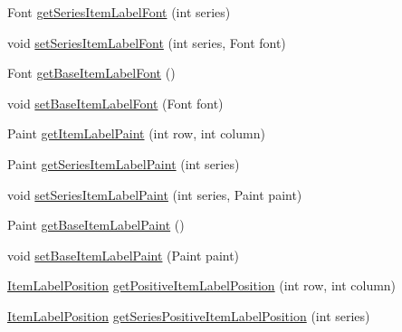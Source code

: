 \begin{DoxyCompactItemize}
\item 
Font \mbox{\hyperlink{interfaceorg_1_1jfree_1_1chart_1_1renderer_1_1xy_1_1_x_y_item_renderer_ab71c90261054a6698b53cb96970cca90}{get\+Series\+Item\+Label\+Font}} (int series)
\item 
void \mbox{\hyperlink{interfaceorg_1_1jfree_1_1chart_1_1renderer_1_1xy_1_1_x_y_item_renderer_a4f99a8d6558ef4bcea37c2f820857b80}{set\+Series\+Item\+Label\+Font}} (int series, Font font)
\item 
Font \mbox{\hyperlink{interfaceorg_1_1jfree_1_1chart_1_1renderer_1_1xy_1_1_x_y_item_renderer_a45bb73763c2f4ec4c212350abaf7a5b5}{get\+Base\+Item\+Label\+Font}} ()
\item 
void \mbox{\hyperlink{interfaceorg_1_1jfree_1_1chart_1_1renderer_1_1xy_1_1_x_y_item_renderer_a5ab327bbbdbfa822d87e23e2a0619c62}{set\+Base\+Item\+Label\+Font}} (Font font)
\item 
Paint \mbox{\hyperlink{interfaceorg_1_1jfree_1_1chart_1_1renderer_1_1xy_1_1_x_y_item_renderer_a7d88654e2caaf90b994ebab7a5fe0abf}{get\+Item\+Label\+Paint}} (int row, int column)
\item 
Paint \mbox{\hyperlink{interfaceorg_1_1jfree_1_1chart_1_1renderer_1_1xy_1_1_x_y_item_renderer_a4de36c3b8a459d72af75f20f253be2cd}{get\+Series\+Item\+Label\+Paint}} (int series)
\item 
void \mbox{\hyperlink{interfaceorg_1_1jfree_1_1chart_1_1renderer_1_1xy_1_1_x_y_item_renderer_a83e3bce5da4ac920d662099c995252a4}{set\+Series\+Item\+Label\+Paint}} (int series, Paint paint)
\item 
Paint \mbox{\hyperlink{interfaceorg_1_1jfree_1_1chart_1_1renderer_1_1xy_1_1_x_y_item_renderer_ab42b215e825414ef3c0d345b3ae39bce}{get\+Base\+Item\+Label\+Paint}} ()
\item 
void \mbox{\hyperlink{interfaceorg_1_1jfree_1_1chart_1_1renderer_1_1xy_1_1_x_y_item_renderer_aa1ba3f77c7f073a7214dc7ff3e42536e}{set\+Base\+Item\+Label\+Paint}} (Paint paint)
\item 
\mbox{\hyperlink{classorg_1_1jfree_1_1chart_1_1labels_1_1_item_label_position}{Item\+Label\+Position}} \mbox{\hyperlink{interfaceorg_1_1jfree_1_1chart_1_1renderer_1_1xy_1_1_x_y_item_renderer_ad33b91a9c40ec78db443444489cba3bf}{get\+Positive\+Item\+Label\+Position}} (int row, int column)
\item 
\mbox{\hyperlink{classorg_1_1jfree_1_1chart_1_1labels_1_1_item_label_position}{Item\+Label\+Position}} \mbox{\hyperlink{interfaceorg_1_1jfree_1_1chart_1_1renderer_1_1xy_1_1_x_y_item_renderer_ad43ae7b5ccf295ef85f6a9960d593c3d}{get\+Series\+Positive\+Item\+Label\+Position}} (int series)

\end{DoxyCompactItemize}
